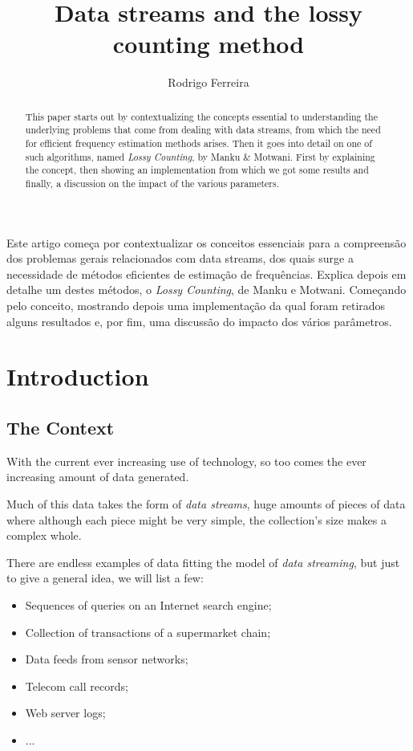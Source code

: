 \documentclass[...]{revdetua}
\begin{document}

\title{Data streams and the lossy counting method}
\author{Rodrigo Ferreira} %
\maketitle

\begin{resumo}%
	Este artigo começa por contextualizar os conceitos essenciais para a compreensão dos problemas gerais relacionados com data streams, dos quais surge a necessidade de métodos eficientes de estimação de frequências.
Explica depois em detalhe um destes métodos, o \textit{Lossy Counting}, de Manku e Motwani. Começando pelo conceito, mostrando depois uma implementação da qual foram retirados alguns resultados e, por fim, uma discussão do impacto dos vários parâmetros.
\end{resumo}

\begin{abstract}%
 This paper starts out by contextualizing the concepts essential to understanding the underlying problems that come from dealing with data streams, from which the need for efficient frequency estimation methods arises.
 Then it goes into detail on one of such algorithms, named \textit{Lossy Counting}, by Manku \& Motwani. First by explaining the concept, then showing an implementation from which we got some results and finally, a discussion on the impact of the various parameters.
\end{abstract}
\section{Introduction}
\subsection{The Context}
With the current ever increasing use of technology, so too comes the ever increasing amount of data generated.\par
Much of this data takes the form of \textit{data streams}, huge amounts of pieces of data where although each piece might be very simple, the collection's size makes a complex whole.\par
There are endless examples of data fitting the model of \textit{data streaming}, but just to give a general idea, we will list a few:
\begin{itemize}
\item Sequences of queries on an Internet search engine;
\item Collection of transactions of a supermarket chain;
\item Data feeds from sensor networks;
\item Telecom call records;
\item Web server logs;
\item ...
\end{itemize}
\end{document}
